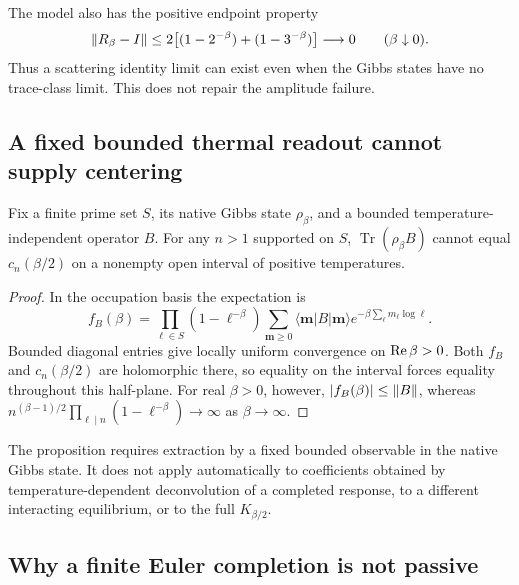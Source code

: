 The model also has the positive endpoint property
\begin{equation}
 \left\lVert R_\beta-I\right\rVert\le2\bigl[(1-2^{-\beta})+(1-3^{-\beta})\bigr]
 \longrightarrow0\qquad(\beta\downarrow0).
\end{equation}
Thus a scattering identity limit can exist even when the Gibbs states
have no trace-class limit. This does not repair the amplitude failure.

\subsection{A fixed bounded thermal readout cannot supply centering}

\begin{proposition}
\label{prop:fixed_thermal_readout}
Fix a finite prime set $S$, its native Gibbs state $\rho_\beta$, and
a bounded temperature-independent operator $B$. For any $n>1$
supported on $S$, $\operatorname{Tr}(\rho_\beta B)$ cannot equal
$c_n(\beta/2)$ on a nonempty open interval of positive temperatures.
\end{proposition}
\begin{proof}
In the occupation basis the expectation is
\begin{equation}
 f_B(\beta)=\prod_{\ell\in S}(1-\ell^{-\beta})
 \sum_{\mathbf m\ge0}\langle\mathbf m|B|\mathbf m\rangle
 e^{-\beta\sum_\ell m_\ell\log\ell}.
\end{equation}
Bounded diagonal entries give locally uniform convergence on
$\operatorname{Re}\beta>0$. Both $f_B$ and $c_n(\beta/2)$ are holomorphic there,
so equality on the interval forces equality throughout this half-plane.
For real $\beta>0$, however, $|f_B(\beta)|\le\left\lVert B\right\rVert$, whereas
$n^{(\beta-1)/2}\prod_{\ell\mid n}(1-\ell^{-\beta})\to\infty$
as $\beta\to\infty$.
\end{proof}
The proposition requires extraction by a fixed bounded observable in
the native Gibbs state. It does not apply automatically to coefficients
obtained by temperature-dependent deconvolution of a completed response,
to a different interacting equilibrium, or to the full $K_{\beta/2}$.

\subsection{Why a finite Euler completion is not passive}


